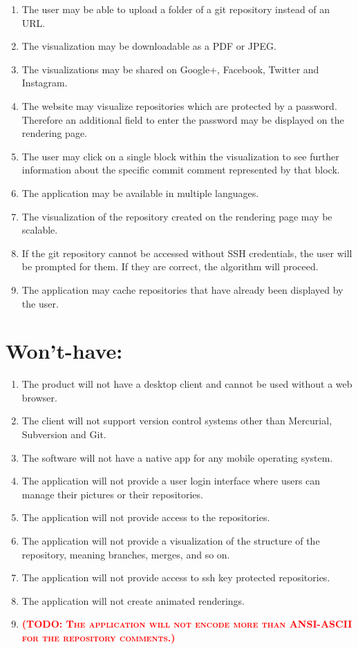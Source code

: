 \documentclass[12pt]{scrartcl}
\newcommand{\todo}[1]{\textbf{\textsc{\textcolor{red}{(TODO: #1)}}}}
\begin{document}
\begin{enumerate}
\item The user may be able to upload a folder of a git repository instead of an URL.
\item The visualization may be downloadable as a PDF or JPEG.
\item The visualizations may be shared on Google+, Facebook, Twitter and Instagram.
\item The website may visualize repositories which are protected by a password. Therefore an additional field to enter the password may be displayed on the rendering page.
\item The user may click on a single block within the visualization to see further information about the specific commit comment represented by that block.
\item The application may be available in multiple languages.
\item The visualization of the repository created on the rendering page may be scalable.
\item If the git repository cannot be accessed without SSH credentials, the user will be prompted for them. If they are correct, the algorithm will proceed.
\item The application may cache repositories that have already been displayed by the user.
\end{enumerate}
\section{Won't-have:}
\begin{enumerate}
\item The product will not have a desktop client and cannot be used without a web browser.
\item The client will not support version control systems other than Mercurial, Subversion and Git.
\item The software will not have a native app for any mobile operating system.
\item The application will not provide a user login interface where users can manage their pictures or their repositories.
\item The application will not provide access to the repositories.
\item The application will not provide a visualization of the structure of the repository, meaning branches, merges, and so on.
\item The application will not provide access to ssh key protected repositories.
\item The application will not create animated renderings.
\item \todo{ The application will not encode more than ANSI-ASCII for the repository comments.}
\end{enumerate}
\end{document}
